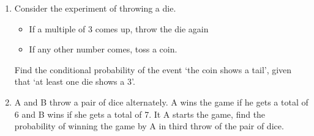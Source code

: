 \begin{enumerate}[label=\thechapter.\arabic*,ref=\thechapter.\theenumi]
	\item Consider the experiment of throwing a die.
    \begin{itemize}
        \item If a multiple of 3 comes up, throw the die again
        \item If any other number comes, toss a coin.
    \end{itemize}
     Find the conditional probability of the event \lq the coin shows a tail\rq, given that \lq at least one die shows a 3\rq.\\
		
  \item  A and B throw a pair of dice alternately. A wins the game if he gets a total of
6 and B wins if she gets a total of 7. It A starts the game, find the probability of
winning the game by A in third throw of the pair of dice.
\\

\end{enumerate}
